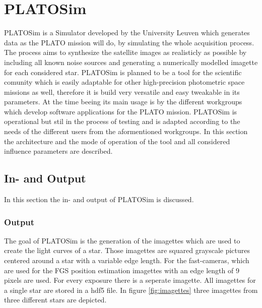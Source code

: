 \section{PLATOSim}
PLATOSim is a Simulator developed by the University Leuven which generates data as the PLATO mission will do, by simulating the whole acquisition process. The process aims to synthesize the satellite images as realisticly as possible by including all known noise sources and generating a numerically modelled imagette for each considered star. 
\newline
PLATOSim is planned to be a tool for the scientific comunity which is easily adaptable for other high-precision photometric space missions as well, therefore it is build very versatile and easy tweakable in its parameters. At the time beeing its main usage is by the different workgroups which develop software applications for the PLATO mission. PLATOSim is operational but stil in the process of testing and is adapted according to the needs of the different users from the aformentioned workgroups.
\newline
In this section the architecture and the mode of operation of the tool and all considered influence parameters are described.
\subsection{In- and Output}
In this section the in- and output of PLATOSim is discussed. 
\subsubsection{Output}
The goal of PLATOSim is the generation of the imagettes which are used to create the light curves of a star. Those imagettes are squared grayscale pictures centered around a star with a variable edge length. For the fast-cameras, which are used for the FGS position estimation imagettes with an edge length of 9 pixels are used. For every exposure there is a seperate imagette. All imagettes for a single star are stored in a hdf5 file. In figure \ref{fig:imagettes} three imagettes from three different stars are depicted. 

